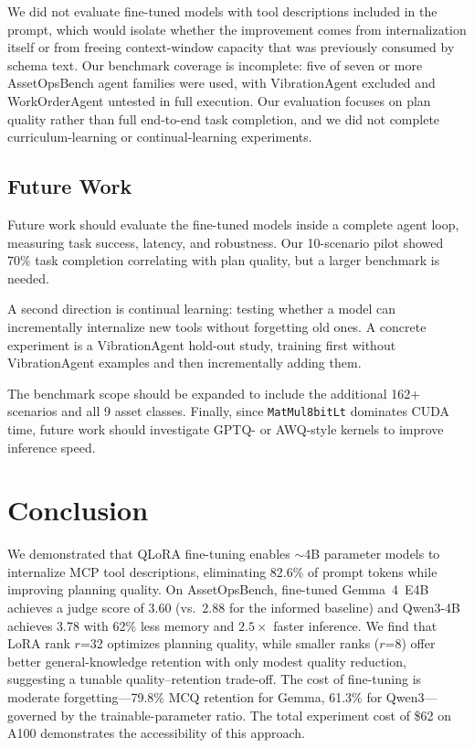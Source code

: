 \documentclass[conference]{IEEEtran}
\begin{document}
We did not evaluate fine-tuned models with tool descriptions included in the prompt, which would isolate whether the improvement comes from internalization itself or from freeing context-window capacity that was previously consumed by schema text. Our benchmark coverage is incomplete: five of seven or more AssetOpsBench agent families were used, with VibrationAgent excluded and WorkOrderAgent untested in full execution. Our evaluation focuses on plan quality rather than full end-to-end task completion, and we did not complete curriculum-learning or continual-learning experiments.


\subsection{Future Work}

Future work should evaluate the fine-tuned models inside a complete agent loop, measuring task success, latency, and robustness. Our 10-scenario pilot showed 70\% task completion correlating with plan quality, but a larger benchmark is needed.

A second direction is continual learning: testing whether a model can incrementally internalize new tools without forgetting old ones. A concrete experiment is a VibrationAgent hold-out study, training first without VibrationAgent examples and then incrementally adding them.

The benchmark scope should be expanded to include the additional 162+ scenarios and all 9 asset classes. Finally, since \texttt{MatMul8bitLt} dominates CUDA time, future work should investigate GPTQ- or AWQ-style kernels to improve inference speed.


\section{Conclusion}

We demonstrated that QLoRA fine-tuning enables $\sim$4B parameter models to internalize MCP tool descriptions, eliminating 82.6\% of prompt tokens while improving planning quality. On AssetOpsBench, fine-tuned Gemma~4~E4B achieves a judge score of 3.60 (vs.\ 2.88 for the informed baseline) and Qwen3-4B achieves 3.78 with 62\% less memory and $2.5\times$ faster inference. We find that LoRA rank $r$=32 optimizes planning quality, while smaller ranks ($r$=8) offer better general-knowledge retention with only modest quality reduction, suggesting a tunable quality--retention trade-off. The cost of fine-tuning is moderate forgetting---79.8\% MCQ retention for Gemma, 61.3\% for Qwen3---governed by the trainable-parameter ratio. The total experiment cost of \$62 on A100 demonstrates the accessibility of this approach.
\end{document}
